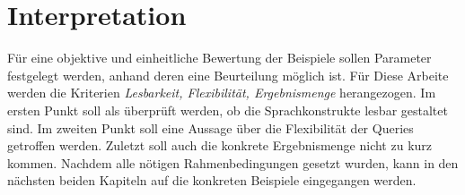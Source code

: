 \section{Interpretation}
Für eine objektive und einheitliche Bewertung der Beispiele sollen Parameter festgelegt
werden, anhand deren eine Beurteilung möglich ist. Für Diese Arbeite werden die Kriterien
\textit{Lesbarkeit, Flexibilität, Ergebnismenge} herangezogen. Im ersten Punkt soll
als überprüft werden, ob die Sprachkonstrukte lesbar gestaltet sind. Im zweiten Punkt
soll eine Aussage über die Flexibilität der Queries getroffen werden. Zuletzt
soll auch die konkrete Ergebnismenge nicht zu kurz kommen. Nachdem alle nötigen Rahmenbedingungen
gesetzt wurden, kann in den nächsten beiden Kapiteln auf die konkreten Beispiele
eingegangen werden.